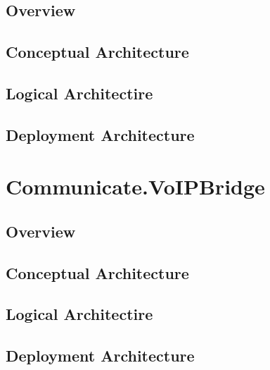 \documentclass[a4paper]{book}
\begin{document}
\section{Overview}
\section{Conceptual Architecture}
\section{Logical Architectire}
\section{Deployment Architecture}

\chapter{Communicate.VoIPBridge}
\section{Overview}
\section{Conceptual Architecture}
\section{Logical Architectire}
\section{Deployment Architecture}
\end{document}
